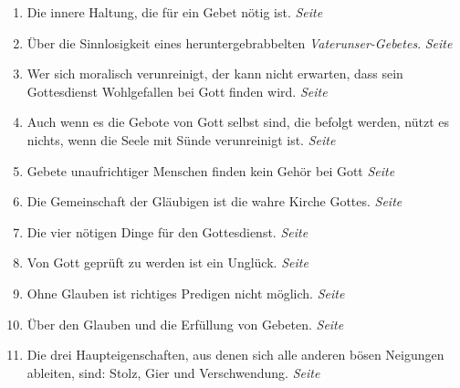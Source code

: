 \begin{enumerate}
 \item Die innere Haltung, die für ein Gebet nötig ist.
 \dotfill \textit{Seite~\pageref{ref:06_04_gebetshaltung}}\\

 \item Über die Sinnlosigkeit eines heruntergebrabbelten
\textit{Vaterunser-Gebetes}.
 \dotfill \textit{Seite~\pageref{ref:06_07_sinnlose_gebete}}\\

 \item Wer sich moralisch verunreinigt, der kann nicht erwarten, dass sein
Gottesdienst Wohlgefallen bei Gott finden wird.
 \dotfill \textit{Seite
\pageref{ref:06_08_moralisch_verunreinigt}}\\

 \item Auch wenn es die Gebote von Gott selbst sind, die befolgt werden, nützt
es nichts, wenn die Seele mit Sünde verunreinigt ist.
 \dotfill \textit{Seite~\pageref{ref:06_09_gottesregeln}}\\

 \item Gebete unaufrichtiger Menschen finden kein Gehör bei Gott
 \dotfill \textit{Seite~\pageref{ref:06_09_gebetserhoerung}}\\

 \item Die Gemeinschaft der Gläubigen ist die wahre Kirche Gottes.
 \dotfill \textit{Seite~\pageref{ref:06_12_wahre_kirche}}\\

 \item Die vier nötigen Dinge für den Gottesdienst.
 \dotfill \textit{Seite
\pageref{ref:06_13_vier_noetige_dinge}}\\

 \item Von Gott geprüft zu werden ist ein Unglück.
 \dotfill \textit{Seite
\pageref{ref:06_13_auf_die_probe_gestellt}}\\

 \item Ohne Glauben ist richtiges Predigen nicht möglich.
 \dotfill \textit{Seite~\pageref{ref:06_14_predigt}}\\

 \item Über den Glauben und die Erfüllung von Gebeten.
 \dotfill \textit{Seite~\pageref{ref:06_14_gebetserfuellung}}\\

 \item Die drei Haupteigenschaften, aus denen sich alle anderen bösen Neigungen
ableiten, sind: Stolz, Gier und Verschwendung.
 \dotfill \textit{Seite
\pageref{ref:07_01_drei_haupteigenschaften}}\\


\end{enumerate}

